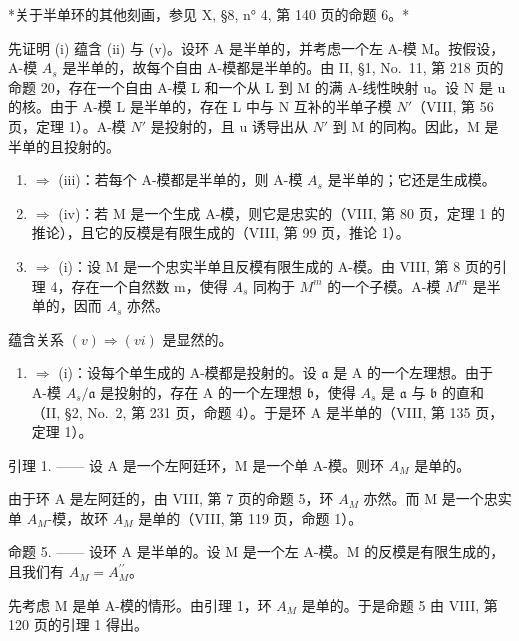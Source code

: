 *关于半单环的其他刻画，参见 X, §8, n° 4, 第 140 页的命题 6。*

先证明 (i) 蕴含 (ii) 与 (v)。设环 A 是半单的，并考虑一个左 A-模 M。按假设，A-模 \(A_{s}\) 是半单的，故每个自由 A-模都是半单的。由 II, §1, No.~11, 第 218 页的命题 20，存在一个自由 A-模 L 和一个从 L 到 M 的满 A-线性映射 u。设 N 是 u 的核。由于 A-模 L 是半单的，存在 L 中与 N 互补的半单子模 \(N'\)（VIII, 第 56 页，定理 1）。A-模 \(N'\) 是投射的，且 u 诱导出从 \(N'\) 到 M 的同构。因此，M 是半单的且投射的。

\begin{enumerate}
\def\labelenumi{(\roman{enumi})}
\setcounter{enumi}{1}
\item
  \(\Rightarrow\) (iii)：若每个 A-模都是半单的，则 A-模 \(A_{s}\) 是半单的；它还是生成模。
\item
  \(\Rightarrow\) (iv)：若 M 是一个生成 A-模，则它是忠实的（VIII, 第 80 页，定理 1 的推论），且它的反模是有限生成的（VIII, 第 99 页，推论 1）。
\item
  \(\Rightarrow\) (i)：设 M 是一个忠实半单且反模有限生成的 A-模。由 VIII, 第 8 页的引理 4，存在一个自然数 m，使得 \(A_{s}\) 同构于 \(M^{m}\) 的一个子模。A-模 \(M^{m}\) 是半单的，因而 \(A_{s}\) 亦然。
\end{enumerate}

蕴含关系 \((v) \Rightarrow (vi)\) 是显然的。

\begin{enumerate}
\def\labelenumi{(\roman{enumi})}
\setcounter{enumi}{5}
\tightlist
\item
  \(\Rightarrow\) (i)：设每个单生成的 A-模都是投射的。设 \(\mathfrak{a}\) 是 A 的一个左理想。由于 A-模 \(A_s / \mathfrak{a}\) 是投射的，存在 A 的一个左理想 \(\mathfrak{b}\)，使得 \(A_s\) 是 \(\mathfrak{a}\) 与 \(\mathfrak{b}\) 的直和（II, §2, No.~2, 第 231 页，命题 4）。于是环 A 是半单的（VIII, 第 135 页，定理 1）。
\end{enumerate}

引理 1. —— 设 A 是一个左阿廷环，M 是一个单 A-模。则环 \(A_{M}\) 是单的。

由于环 A 是左阿廷的，由 VIII, 第 7 页的命题 5，环 \(A_{M}\) 亦然。而 M 是一个忠实单 \(A_{M}\)-模，故环 \(A_{M}\) 是单的（VIII, 第 119 页，命题 1）。

命题 5. —— 设环 A 是半单的。设 M 是一个左 A-模。M 的反模是有限生成的，且我们有 \(A_{M} = A_{M}^{\prime\prime}\)。

先考虑 M 是单 A-模的情形。由引理 1，环 \(A_{M}\) 是单的。于是命题 5 由 VIII, 第 120 页的引理 1 得出。

